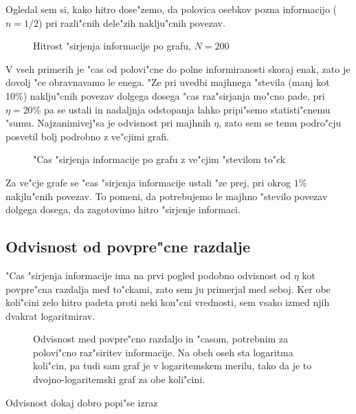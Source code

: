\documentclass[a4paper,10pt]{article}
\begin{document}
Ogledal sem si, kako hitro dose"zemo, da polovica osebkov pozna informacijo ($n = 1/2$) pri razli"cnih dele"zih naklju"cnih povezav. 

\begin{figure}[!h]
 
  \caption{Hitrost "sirjenja informacije po grafu, $N=200$}
\label{fig:hitrost-200}
\end{figure}

V vseh primerih je "cas od polovi"cne do polne informiranosti skoraj enak, zato je dovolj "ce obravnavamo le enega. "Ze pri uvedbi majhnega "stevila (manj kot 10\%) naklju"cnih povezav dolgega dosega "cas raz"sirjanja mo"cno pade, pri $\eta=20\%$ pa se ustali in nadaljnja odstopanja lahko pripi"semo statisti"cnemu "sumu. Najzanimivej"sa je odvisnost pri majhnih $\eta$, zato sem se temu podro"cju posvetil bolj podrobno z ve"cjimi grafi. 


\begin{figure}[!h]
 
  \caption{"Cas "sirjenja informacije po grafu z ve"cjim "stevilom to"ck}
\label{fig:hitrost-large}
\end{figure}

Za ve"cje grafe se "cas "sirjenja informacije ustali "ze prej, pri okrog $1\%$ nakjlu"cnih povezav. To pomeni, da potrebujemo le majhno "stevilo povezav dolgega dosega, da zagotovimo hitro "sirjenje informaci.

\newpage

\subsection{Odvisnost od povpre"cne razdalje}

"Cas "sirjenja informacije ima na prvi pogled podobno odvisnost od $\eta$ kot povpre"cna razdalja med to"ckami, zato sem ju primerjal med seboj. Ker obe koli"cini zelo hitro padeta proti neki kon"cni vrednosti, sem vsako izmed njih dvakrat logaritmirav. 


\begin{figure}[!h]
 
  \caption{Odvisnost med povpre"cno razdaljo in "casom, potrebnim za polovi"cno raz"siritev informacije. Na obeh oseh sta logaritma koli"cin, pa tudi sam graf je v logaritemskem merilu, tako da je to dvojno-logaritemski graf za obe koli"cini. }
\label{fig:hitrost-large}
\end{figure}

Odvisnost dokaj dobro popi"se izraz
\begin{comment}
\begin{align}
 \ln \tau &= A r^b \\
 \tau &= \exp\left(Ar^b\right) = \left(e^A\right)^{r^b} = C^{r^b}
\end{align}
\end{comment}
\end{document}
